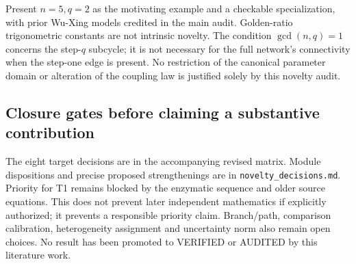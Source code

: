 Present $n=5,q=2$ as the motivating example and a checkable specialization,
with prior Wu-Xing models credited in the main audit. Golden-ratio
trigonometric constants are not intrinsic novelty. The condition
$\gcd(n,q)=1$ concerns the step-$q$ subcycle; it is not necessary for
the full network's connectivity when the step-one edge is present.
No restriction of the canonical parameter domain or alteration of the
coupling law is justified solely by this novelty audit.

\subsection{Closure gates before claiming a substantive contribution}
The eight target decisions are in the accompanying revised matrix.
Module dispositions and precise proposed strengthenings are in
\texttt{novelty\_decisions.md}. Priority for T1 remains blocked by the
enzymatic sequence and older source equations. This does not prevent
later independent mathematics if explicitly authorized; it prevents a
responsible priority claim. Branch/path, comparison calibration,
heterogeneity assignment and uncertainty norm also remain open choices.
No result has been promoted to VERIFIED or AUDITED by this literature work.

